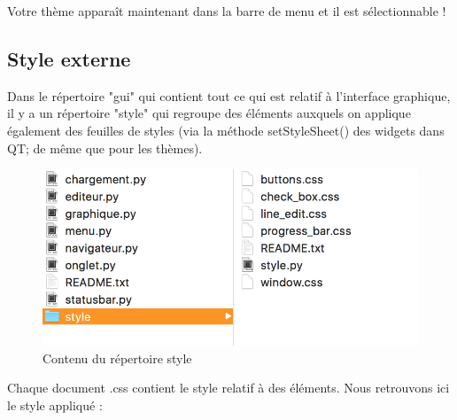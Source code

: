 \documentclass[a4paper,12pt]{article}
\begin{document}
			Votre thème apparaît maintenant dans la barre de menu et il est sélectionnable !
					
		\subsection{Style externe}
	
		Dans le répertoire "gui" qui contient tout ce qui est relatif à l'interface graphique, il y a un répertoire "style" qui regroupe des éléments auxquels on applique également des feuilles de styles (via la méthode setStyleSheet() des widgets dans QT; de même que pour les thèmes).
		
		\begin{figure}[h!]
			\begin{center}
				\includegraphics[scale=0.5]{images/imgs_themes/style}
				\caption{Contenu du répertoire style}
			\end{center}
		\end{figure}
		\newpage
				
		Chaque document .css contient le style relatif à des éléments. Nous retrouvons ici le style appliqué :
		
\end{document}
